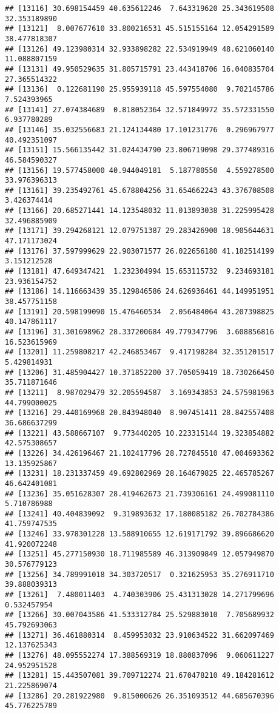 \documentclass[
]{article}
\begin{document}
\begin{verbatim}
## [13116] 30.698154459 40.635612246  7.643319620 25.343619508 32.353189890
## [13121]  8.007677610 33.800216531 45.515155164 12.054291589 38.477818307
## [13126] 49.123980314 32.933898282 22.534919949 48.621060140 11.088807159
## [13131] 49.950529635 31.805715791 23.443418706 16.040835704 27.365514322
## [13136]  0.122681190 25.955939118 45.597554080  9.702145786  7.524393965
## [13141] 27.074384689  0.818052364 32.571849972 35.572331550  6.937780289
## [13146] 35.032556683 21.124134480 17.101231776  0.296967977 40.492351097
## [13151] 15.566135442 31.024434790 23.806719098 29.377489316 46.584590327
## [13156] 19.577458000 40.944049181  5.187780550  4.559278500 33.976396313
## [13161] 39.235492761 45.678804256 31.654662243 43.376708508  3.426374414
## [13166] 20.685271441 14.123548032 11.013893038 31.225995428 32.496885909
## [13171] 39.294268121 12.079751387 29.283426900 18.905644631 47.171173024
## [13176] 37.597999629 22.903071577 26.022656180 41.182514199  3.151212528
## [13181] 47.649347421  1.232304994 15.653115732  9.234693181 23.936154752
## [13186] 14.116663439 35.129846586 24.626936461 44.149951951 38.457751158
## [13191] 20.598199090 15.476460534  2.056484064 43.207398825 40.147861117
## [13196] 31.301698962 28.337200684 49.779347796  3.608856816 16.523615969
## [13201] 11.259808217 42.246853467  9.417198284 32.351201517  5.429814931
## [13206] 31.485904427 10.371852200 37.705059419 18.730266450 35.711871646
## [13211]  8.987029479 32.205594587  3.169343853 24.575981963 44.799000025
## [13216] 29.440169968 20.843948040  8.907451411 28.842557408 36.686637299
## [13221] 43.588667107  9.773440205 10.223315144 19.323854882 42.575308657
## [13226] 34.426196467 21.102417796 28.727845510 47.004693362 13.135925867
## [13231] 18.231337459 49.692802969 28.164679825 22.465785267 46.642401081
## [13236] 35.051628307 28.419462673 21.739306161 24.499081110  5.710786988
## [13241] 40.404839092  9.319893632 17.180085182 26.702784386 41.759747535
## [13246] 33.978301228 13.588910655 12.619171792 39.896686620 41.920072248
## [13251] 45.277150930 18.711985589 46.313909849 12.057949870 30.576779123
## [13256] 34.789991018 34.303720517  0.321625953 35.276911710 39.888039313
## [13261]  7.480011403  4.740303906 25.431313028 14.271799696  0.532457954
## [13266] 30.007043586 41.533312784 25.529883010  7.705689932 45.792693063
## [13271] 36.461880314  8.459953032 23.910634522 31.662097469 12.137625343
## [13276] 48.095552274 17.388569319 18.880837096  9.060611227 24.952951528
## [13281] 15.443507081 39.709712274 21.670478210 49.184281612 21.225869074
## [13286] 20.281922980  9.815000626 26.351093512 44.685670396 45.776225789

\end{verbatim}
\end{document}
